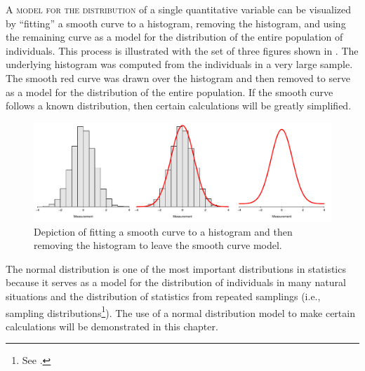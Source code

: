 \documentclass[10pt,openany]{book}\usepackage[]{graphicx}\usepackage[]{color}
\newenvironment{knitrout}{}{} %
\begin{document}
\minitoc
\newpage


\lettrine{A}{ model for the distribution} of a single quantitative variable can be visualized by ``fitting'' a smooth curve to a histogram, removing the histogram, and using the remaining curve as a model for the distribution of the entire population of individuals.  This process is illustrated with the set of three figures shown in .  The underlying histogram was computed from the individuals in a very large sample.  The smooth red curve was drawn over the histogram and then removed to serve as a model for the distribution of the entire population.  If the smooth curve follows a known distribution, then certain calculations will be greatly simplified.

\begin{knitrout}
\color{fgcolor}\begin{figure}[hbtp]

{\centering \includegraphics[width=.95\linewidth]{Figs/NormDensityEx-1} 

}

\caption[Depiction of fitting a smooth curve to a histogram and then removing the histogram to leave the smooth curve model]{Depiction of fitting a smooth curve to a histogram and then removing the histogram to leave the smooth curve model.}\label{fig:NormDensityEx}
\end{figure}


\end{knitrout}

The normal distribution is one of the most important distributions in statistics because it serves as a model for the distribution of individuals in many natural situations and the distribution of statistics from repeated samplings (i.e., sampling distributions\footnote{See .}).  The use of a normal distribution model to make certain calculations will be demonstrated in this chapter.
\end{document}
